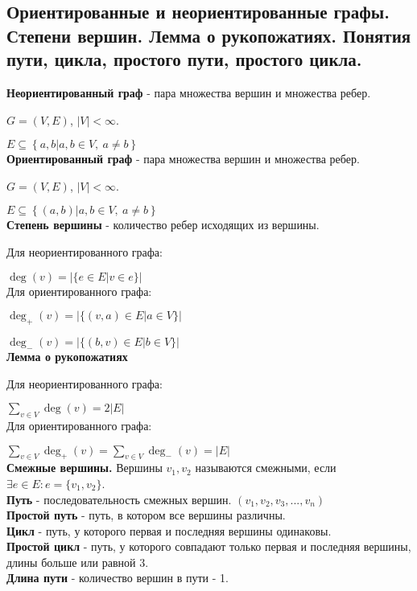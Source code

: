 \subsection{Ориентированные и неориентированные графы. Степени вершин. Лемма о рукопожатиях. Понятия пути, цикла, простого пути, простого цикла.}
\textbf{Неориентированный граф} - пара множества вершин и множества ребер.

$G = (V, E)$, $|V| < \infty$.

$E \subseteq \left\{ {a, b} | a, b \in V, \ a \neq b\right\}$\\

\textbf{Ориентированный граф} - пара множества вершин и множества ребер.

$G = (V, E)$, $|V| < \infty$.

$E \subseteq \left\{ (a, b) | a, b \in V, \ a \neq b\right\}$\\

\textbf{Степень вершины} - количество ребер исходящих из вершины.

Для неориентированного графа:

$\deg (v) = |\{e \in E | v \in e\}|$\\

Для ориентированного графа:

$\deg_{+} (v) = |\{(v, a) \in E | a \in V\}|$

$\deg_{-} (v) = |\{(b, v) \in E | b \in V\}|$\\

\textbf{Лемма о рукопожатиях}

Для неориентированного графа:

$\sum\limits_{v \in V} \deg (v) = 2 |E|$\\

Для ориентированного графа:

$\sum\limits_{v \in V} \deg_{+} (v) = \sum\limits_{v \in V} \deg_{-} (v) = |E|$\\

\textbf{Смежные вершины.} Вершины $v_1, v_2$ называются смежными, если $\exists e \in E : e = \{v_1, v_2\}$.\\

\textbf{Путь} - последовательность смежных вершин. $(v_1, v_2, v_3, ..., v_n)$\\

\textbf{Простой путь} - путь, в котором все вершины различны.\\

\textbf{Цикл} - путь, у которого первая и последняя вершины одинаковы.\\

\textbf{Простой цикл} - путь, у которого совпадают только первая и последняя вершины, длины больше или равной 3.\\

\textbf{Длина пути} - количество вершин в пути - 1.